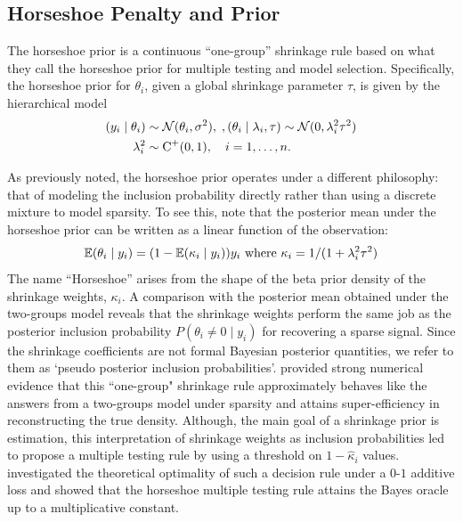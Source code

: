\documentclass[11pt]{article}
\begin{document}
\subsection{Horseshoe Penalty and Prior}
\label{sec:one-gp}


The horseshoe prior is a continuous ``one-group'' shrinkage rule based on what
they call the horseshoe prior for multiple testing and model selection.
Specifically, the horseshoe prior for $\theta_i$, given a global shrinkage
parameter $\tau$, is given by the hierarchical model 
\begin{align}
  (y_i \mid \theta_i) & \sim {\cal N}(\theta_i , \sigma^2), \;, 
  (\theta_i \mid \lambda_i, \tau) \sim 
  {\cal N}(0, \lambda_i^2 \tau^2) \nonumber \\ \lambda_i ^2 &
  \sim \operatorname{C}^{+}(0,1), \quad i = 1, \ldots, n. 
  \label{eq:hs}
\end{align}

As previously noted, the horseshoe prior operates under a different philosophy:
that of modeling the inclusion probability directly rather than using a
discrete mixture to model sparsity. To see this, note that the posterior mean
under the horseshoe prior can be written as a linear function of the
observation:
\begin{equation}
\mathbb E(\theta_i \mid y_i) = (1- \mathbb E(\kappa_i \mid y_i))y_i \text{ where } \kappa_i = 1/(1+\lambda_i^2 \tau^2)
\end{equation}
The name ``Horseshoe'' arises from the shape of the beta prior density of the
shrinkage weights, $\kappa_i$. A comparison with the posterior mean obtained
under the two-groups
model reveals that the shrinkage weights perform the same job as the posterior
inclusion probability $P(\theta_i \ne 0 \mid y_i)$ for recovering a sparse
signal. Since the shrinkage coefficients are not formal Bayesian posterior
quantities, we refer to them as `pseudo posterior inclusion probabilities'.
\citet{carvalho2010horseshoe} provided strong numerical evidence that this
``one-group" shrinkage rule approximately behaves like the answers from a
two-groups model under sparsity and attains super-efficiency in reconstructing
the true density. Although, the main goal of a shrinkage prior is estimation,
this interpretation of shrinkage weights as inclusion probabilities led
\citet{carvalho2010horseshoe} to propose a multiple testing rule by using a
threshold on $1-\hat{\kappa}_i$ values. \citet{datta2013asymptotic}
investigated the theoretical optimality of such a decision rule under a $0$-$1$
additive loss and showed that the horseshoe multiple testing rule attains the
Bayes oracle up to a multiplicative constant. 
\end{document}
